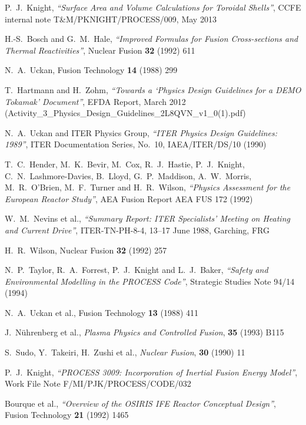 \documentclass[11pt,a4paper]{report}
\begin{document}
\begin{thebibliography}{99}
P.\ J.\ Knight,
\textit{``Surface Area and Volume Calculations for Toroidal Shells''},
CCFE internal note T\&M/PKNIGHT/PROCESS/009, May 2013

H.-S.\ Bosch and G.\ M.\ Hale,
\textit{``Improved Formulas for Fusion Cross-sections and Thermal Reactivities''},
Nuclear Fusion \textbf{32} (1992) 611

N.\ A.\ Uckan,
Fusion Technology \textbf{14} (1988) 299

T.\ Hartmann and H.\ Zohm,
\textit{``Towards a `Physics Design Guidelines for a DEMO Tokamak'
  Document''},
EFDA Report, March 2012 (Activity\_3\_Physics\_Design\_Guidelines\_2L8QVN\_v1\_0(1).pdf)

N.\ A.\ Uckan and ITER Physics Group,
\textit{``ITER Physics Design Guidelines: 1989''},
ITER Documentation Series, No.\ 10, IAEA/ITER/DS/10
(1990)

T.\ C.\ Hender, M.\ K.\ Bevir, M.\ Cox, R.\ J.\ Hastie, P.\ J.\
Knight, C.\ N.\ Lashmore-Davies, B.\ Lloyd, G.\ P.\ Maddison, A.\ W.\
Morris, M.\ R.\ O'Brien, M.\ F.\ Turner and H.\ R.\ Wilson,
\textit{``Physics Assessment for the European Reactor Study''},
AEA Fusion Report AEA FUS 172
(1992)

W.\ M.\ Nevins et al.,
\textit{``Summary Report: ITER Specialists' Meeting on Heating and
Current Drive''},
ITER-TN-PH-8-4,
13--17 June 1988, Garching, FRG

H.\ R.\ Wilson,
Nuclear Fusion \textbf{32} (1992) 257

N.\ P.\ Taylor, R.\ A.\ Forrest, P.\ J.\ Knight and L.\ J.\ Baker,
\textit{``Safety and Environmental Modelling in the PROCESS Code''},
Strategic Studies Note 94/14
(1994)

N.\ A.\ Uckan et al.,
Fusion Technology \textbf{13} (1988) 411

J.\ N\"{u}hrenberg et al., \textit{Plasma Physics and Controlled Fusion},
\textbf{35} (1993) B115

S.\ Sudo, Y.\ Takeiri, H.\ Zushi et al., \textit{Nuclear Fusion}, \textbf{30} (1990)
11

P.\ J.\ Knight,
\textit{``PROCESS 3009: Incorporation of Inertial Fusion Energy Model''},
Work File Note F/MI/PJK/PROCESS/CODE/032

Bourque et al.,
\textit{``Overview of the OSIRIS IFE Reactor Conceptual Design''},
Fusion Technology \textbf{21} (1992) 1465


\end{thebibliography}
\end{document}
